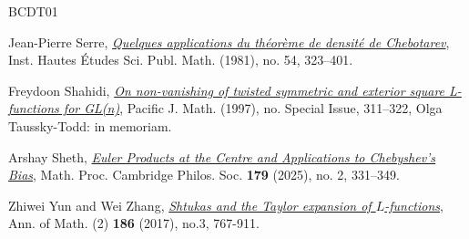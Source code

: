 \documentclass[12pt,reqno]{amsart}
\theoremstyle{definition}
\numberwithin{equation}{section}
\begin{document}
\begin{thebibliography}{BCDT01}






Jean-Pierre Serre, \href{https://www.numdam.org/article/PMIHES_1981__54__123_0.pdf}{\emph{Quelques applications du théorème de densité de Chebotarev}}, Inst. Hautes  Études Sci. Publ. Math. (1981), no. 54, 323–401. 



Freydoon Shahidi, \href{https://msp.org/pjm/1997/181-3/pjm-v181-n3-p17-s.pdf}{\emph{On non-vanishing of twisted symmetric and exterior square L-functions for GL(n)}}, Pacific J. Math. (1997), no. Special Issue, 311–322, Olga Taussky-Todd: in memoriam.

Arshay Sheth, \href{https://www.cambridge.org/core/journals/mathematical-proceedings-of-the-cambridge-philosophical-society/article/euler-products-at-the-centre-and-applications-to-chebyshevs-bias/1DA1AFD9BE7EBCF9D5B49FE792E55E81}{\emph{Euler Products at the Centre and Applications to Chebyshev's Bias}}, Math. Proc. Cambridge Philos. Soc. \textbf{179} (2025), no. 2, 331–349. 

Zhiwei Yun and Wei Zhang, \href{https://annals.math.princeton.edu/2017/186-3/p02}{\emph{Shtukas and the Taylor expansion of $L$-functions}}, Ann. of Math. (2) \textbf{186} (2017), no.3, 767-911. 
\end{thebibliography}
\end{document}
